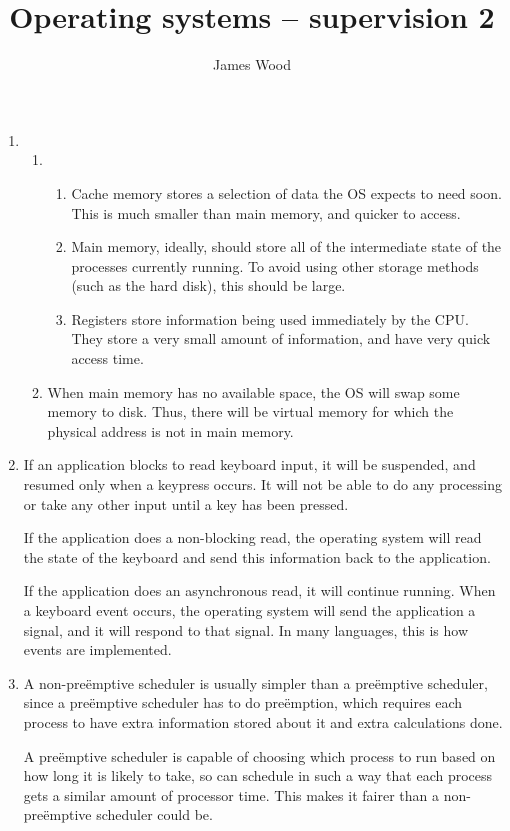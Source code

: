 \documentclass[11pt]{article}
\title{\textbf{Operating systems -- supervision 2}}
\author{James Wood}
\begin{document}
\maketitle

\begin{enumerate}
\item
  \begin{enumerate}
  \item
    \begin{enumerate}
    \item Cache memory stores a selection of data the OS expects to need soon. This is much smaller than main memory, and quicker to access.
    \item Main memory, ideally, should store all of the intermediate state of the processes currently running. To avoid using other storage methods (such as the hard disk), this should be large.
    \item Registers store information being used immediately by the CPU. They store a very small amount of information, and have very quick access time.
    \end{enumerate}
  \item When main memory has no available space, the OS will swap some memory to disk. Thus, there will be virtual memory for which the physical address is not in main memory.
  \end{enumerate}
\item
  If an application blocks to read keyboard input, it will be suspended, and resumed only when a keypress occurs. It will not be able to do any processing or take any other input until a key has been pressed.

  If the application does a non-blocking read, the operating system will read the state of the keyboard and send this information back to the application.

  If the application does an asynchronous read, it will continue running. When a keyboard event occurs, the operating system will send the application a signal, and it will respond to that signal. In many languages, this is how events are implemented.
\item
  A non-preëmptive scheduler is usually simpler than a preëmptive scheduler, since a preëmptive scheduler has to do preëmption, which requires each process to have extra information stored about it and extra calculations done.

  A preëmptive scheduler is capable of choosing which process to run based on how long it is likely to take, so can schedule in such a way that each process gets a similar amount of processor time. This makes it fairer than a non-preëmptive scheduler could be.


\end{enumerate}
\end{document}
